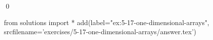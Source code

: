 
\begin{ex}
  \label{ex:5-17-one-dimensional-arrays}
  
  \qed
\end{ex}
\begin{python0}
from solutions import *
add(label="ex:5-17-one-dimensional-arrays",
    srcfilename='exercises/5-17-one-dimensional-arrays/answer.tex')
\end{python0}

